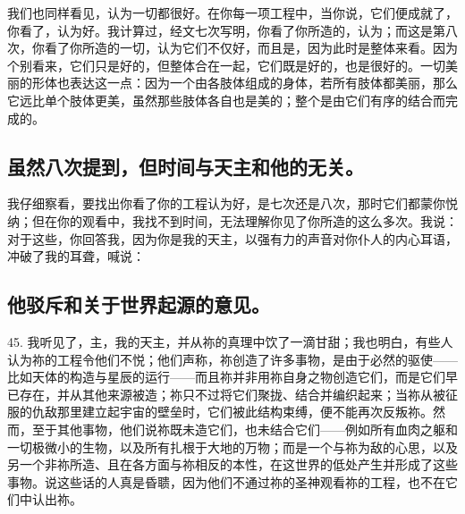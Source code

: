  我们也同样看见，认为一切都很好。在你每一项工程中，当你说，它们便成就了，你看了，认为好。我计算过，经文七次写明，你看了你所造的，认为；而这是第八次，你看了你所造的一切，认为它们不仅好，而且是，因为此时是整体来看。因为个别看来，它们只是好的，但整体合在一起，它们既是好的，也是很好的。一切美丽的形体也表达这一点：因为一个由各肢体组成的身体，若所有肢体都美丽，那么它远比单个肢体更美，虽然那些肢体各自也是美的；整个是由它们有序的结合而完成的。\par


\subsection{虽然八次提到，但时间与天主和他的无关。}

我仔细察看，要找出你看了你的工程认为好，是七次还是八次，那时它们都蒙你悦纳；但在你的观看中，我找不到时间，无法理解你见了你所造的这么多次。我说：对于这些，你回答我，因为你是我的天主，以强有力的声音对你仆人的内心耳语，冲破了我的耳聋，喊说：\par


\subsection{他驳斥和关于世界起源的意见。}

45. 我听见了，主，我的天主，并从祢的真理中饮了一滴甘甜；我也明白，有些人认为祢的工程令他们不悦；他们声称，祢创造了许多事物，是由于必然的驱使——比如天体的构造与星辰的运行——而且祢并非用祢自身之物创造它们，而是它们早已存在，并从其他来源被造；祢只不过将它们聚拢、结合并编织起来；当祢从被征服的仇敌那里建立起宇宙的壁垒时，它们被此结构束缚，便不能再次反叛祢。然而，至于其他事物，他们说祢既未造它们，也未结合它们——例如所有血肉之躯和一切极微小的生物，以及所有扎根于大地的万物；而是一个与祢为敌的心思，以及另一个非祢所造、且在各方面与祢相反的本性，在这世界的低处产生并形成了这些事物。说这些话的人真是昏聩，因为他们不通过祢的圣神观看祢的工程，也不在它们中认出祢。\par

